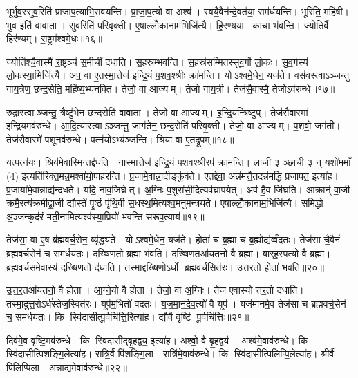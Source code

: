 भूर्भुव॒स्सुव॒रिति॑ प्राजाप॒त्याभि॒राव॑यन्ति। प्रा॒जा॒प॒त्यो वा अश्व॑। स्वयै॒वैन॑न्दे॒वत॑या॒ सम॑र्धयन्ति। भूरिति॒ महि॑षी। भुव॒ इति॑ वा॒वाता। सुव॒रिति॑ परिवृ॒क्ती। ए॒षाल्लोँ॒काना॑म॒भिजि॑त्यै। हि॒र॒ण्यया का॒चा भ॑वन्ति। ज्योति॒र्वै हिर॑ण्यम्। रा॒ष्ट्रम॑श्वमे॒धः॥१६॥

ज्योति॑श्चै॒वास्मै॑ रा॒ष्ट्रञ्च॑ स॒मीची॑ दधाति। स॒हस्र॑म्भवन्ति। स॒हस्र॑सम्मितस्सुव॒र्गो लो॒कः। सु॒व॒र्गस्य॑ लो॒कस्या॒भिजि॑त्यै। अप॒ वा ए॒तस्मा॒त्तेज॑ इन्द्रि॒यं प॒शव॒श्श्रीः क्रा॑मन्ति। योऽश्वमे॒धेन॒ यज॑ते। वस॑वस्त्वाऽञ्जन्तु गाय॒त्रेण॒ छन्द॒सेति॒ महि॑ष्य॒भ्य॑नक्ति। तेजो॒ वा आज्यम्। तेजो॑ गाय॒त्री। तेज॑सै॒वास्मै॒ तेजोऽव॑रुन्धे॥१७॥

रु॒द्रास्त्वाञ्जन्तु॒ त्रैष्टु॑भेन॒ छन्द॒सेति॑ वा॒वाता। तेजो॒ वा आज्यम्। इ॒न्द्रि॒यन्त्रि॒ष्टुप्। तेज॑सै॒वास्मा॑ इन्द्रि॒यमव॑रुन्धे। आ॒दि॒त्यास्त्वाऽञ्जन्तु॒ जाग॑तेन॒ छन्द॒सेति॑ परिवृ॒क्ती। तेजो॒ वा आज्यम्। प॒शवो॒ जग॑ती। तेज॑सै॒वास्मे॑ प॒शूनव॑रुन्धे। पत्न॑यो॒ऽभ्य॑ञ्जन्ति। श्रि॒या वा ए॒तद्रू॒पम्॥१८॥

यत्पत्न॑यः। श्रिय॑मे॒वास्मि॒न्तद्द॑धति। नास्मा॒त्तेज॑ इन्द्रि॒यं प॒शव॒श्श्रीरप॑ क्रामन्ति। लाजी ३ ञ्छाची ३ न् यशो॑म॒माँ (4) इत्यति॑रिक्त॒मन्न॒मश्वा॑यो॒पाह॑रन्ति। प्र॒जामे॒वान्ना॒दीङ्कु॑र्वते। ए॒तद्दे॑वा॒ अन्न॑मत्तै॒तदन्न॑मद्धि प्रजापत॒ इत्या॑ह। प्र॒जाया॑मे॒वान्नाद्य॑न्दधते। यदि॒ नाव॒जिघ्रेत्। अ॒ग्निः प॒शुरा॑सी॒दित्यव॑घ्रापयेत्। अव॑ है॒व जि॑घ्रति। आक्रान्॑ वा॒जी क्रमै॒रत्य॑क्रमीद्वा॒जी द्यौस्ते॑ पृ॒ष्ठं पृ॑थि॒वी स॒धस्थ॒मित्यश्व॒मनु॑मन्त्रयते। ए॒षाल्लोँ॒काना॑म॒भिजि॑त्यै। समि॑द्धो अ॒ञ्जन्कृद॑रं मती॒नामित्यश्व॑स्या॒प्रियो॑ भवन्ति सरूप॒त्याय॑॥१९॥\anuvakamend[परि॑त॒स्थुष॒ इत्या॑हे॒मे ए॒वास्मै॑ युनक्त्य॒भिजि॑त्यै भरन्त्यश्वमे॒धो रु॑न्धे रू॒पञ्जि॑घ्रति॒ त्रीणि॑ च]

तेज॑सा॒ वा ए॒ष ब्र॑ह्मवर्च॒सेन॒ व्यृ॑द्ध्यते। योऽश्वमे॒धेन॒ यज॑ते। होता॑ च ब्र॒ह्मा च॑ ब्र॒ह्मोद्य॑व्वँदतः। तेज॑सा चै॒वैनं॑ ब्रह्मवर्च॒सेन॑ च॒ सम॑र्धयतः। द॒ख्षि॒ण॒तो ब्र॒ह्मा भ॑वति। द॒ख्षि॒ण॒तआ॑यतनो॒ वै ब्र॒ह्मा। बा॒र्॒ह॒स्प॒त्यो वै ब्र॒ह्मा। ब्र॒ह्म॒व॒र्च॒समे॒वास्य॑ दख्षिण॒तो द॑धाति। तस्मा॒द्दख्षि॒णोऽर्धो ब्रह्मवर्च॒सित॑रः। उ॒त्त॒र॒तो होता॑ भवति॥२०॥

उ॒त्त॒र॒तआ॑यतनो॒ वै होता। आ॒ग्ने॒यो वै होता। तेजो॒ वा अ॒ग्निः। तेज॑ ए॒वास्योत्तर॒तो द॑धाति। तस्मा॒दुत्त॒रोऽर्ध॑स्तेज॒स्वित॑रः। यूप॑म॒भितो॑ वदतः। य॒ज॒मा॒न॒दे॒व॒त्यो॑ वै यूप॑। यज॑मानमे॒व तेज॑सा च ब्रह्मवर्च॒सेन॑ च॒ सम॑र्धयतः। कि स्वि॑दासीत्पू॒र्वचि॑त्ति॒रित्या॑ह। द्यौर्वै वृष्टि॑ पू॒र्वचि॑त्तिः॥२१॥

दिव॑मे॒व वृष्टि॒मव॑रुन्धे। कि स्वि॑दासीद्बृ॒हद्वय॒ इत्या॑ह। अश्वो॒ वै बृ॒हद्वय॑। अश्व॑मे॒वाव॑रुन्धे। कि स्वि॑दासीत्पिशङ्गि॒लेत्या॑ह। रात्रि॒र्वै पि॑शङ्गि॒ला। रात्रि॑मे॒वाव॑रुन्धे। कि स्वि॑दासीत्पिलिप्पि॒लेत्या॑ह। श्रीर्वै पि॑लिप्पि॒ला। अ॒न्नाद्य॑मे॒वाव॑रुन्धे॥२२॥

